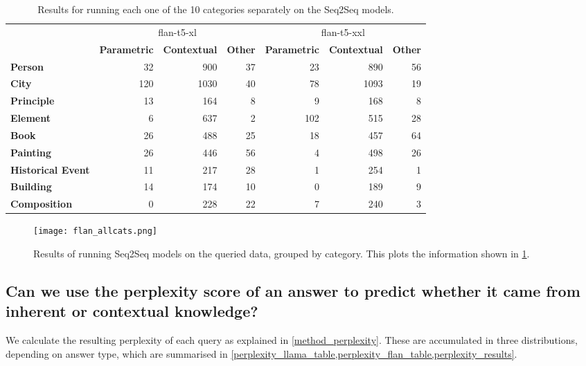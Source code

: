 \begin{table}[h]
	\centering
	\footnotesize
	\begin{tabular}{>{\bfseries}l | r r r | r r r}
		\toprule
			& \multicolumn{3}{|c}{\ttfamily flan-t5-xl} & \multicolumn{3}{|c}{\ttfamily flan-t5-xxl} \\
			& \bfseries Parametric & \bfseries Contextual & \bfseries Other & \bfseries Parametric & \bfseries Contextual & \bfseries Other \\
		\midrule
			Person           &  32 &  900 & 37 &  23 &  890 & 56 \\
			City             & 120 & 1030 & 40 &  78 & 1093 & 19 \\
			Principle        &  13 &  164 &  8 &   9 &  168 &  8 \\
			Element          &   6 &  637 &  2 & 102 &  515 & 28 \\
			Book             &  26 &  488 & 25 &  18 &  457 & 64 \\
			Painting         &  26 &  446 & 56 &   4 &  498 & 26 \\
			Historical Event &  11 &  217 & 28 &   1 &  254 &  1 \\
			Building         &  14 &  174 & 10 &   0 &  189 &  9 \\
			Composition      &   0 &  228 & 22 &   7 &  240 &  3 \\
		\bottomrule
	\end{tabular}
	\caption{Results for running each one of the 10 categories separately on the Seq2Seq models.}
	\label{flan_cats_table}
\end{table}

\begin{figure}[p]
	\centering
	\texttt{[image: flan\_allcats.png]}
	\caption{Results of running Seq2Seq models on the queried data, grouped by category. This plots the information shown in \cref{flan_cats_table}.}
	\label{flan_cats_result}
\end{figure}

\newpage{}

\subsection{Can we use the perplexity score of an answer to predict whether it came from inherent or contextual knowledge?}
\label{results_perplexity_score}

We calculate the resulting perplexity of each query as explained in \cref{method_perplexity}.
These are accumulated in three distributions, depending on answer type, which are summarised in \cref{perplexity_llama_table,perplexity_flan_table,perplexity_results}.

